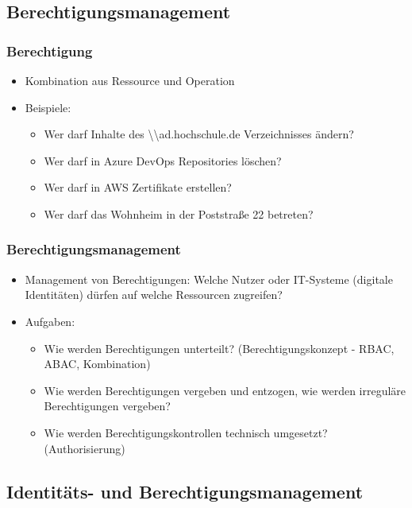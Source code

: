 \documentclass[11pt]{beamer}
\begin{document}
\subsection{Berechtigungsmanagement}
\begin{frame}
  \frametitle{Berechtigung}
  \begin{itemize}
    \item Kombination aus Ressource und Operation~
    \item Beispiele:
          \begin{itemize}
            \item Wer darf Inhalte des \textbackslash{}\textbackslash{}ad.hochschule.de Verzeichnisses ändern?
            \item Wer darf in Azure DevOps Repositories löschen?
            \item Wer darf in AWS Zertifikate erstellen?
            \item Wer darf das Wohnheim in der Poststraße 22 betreten?
          \end{itemize}
  \end{itemize}
\end{frame}

\begin{frame}
  \frametitle{Berechtigungsmanagement}
  \begin{itemize}
    \item Management von Berechtigungen: Welche Nutzer oder IT-Systeme (digitale Identitäten) dürfen auf welche Ressourcen zugreifen?
    \item Aufgaben:
          \begin{itemize}
            \item Wie werden Berechtigungen unterteilt? (Berechtigungskonzept - RBAC, ABAC, Kombination)
            \item Wie werden Berechtigungen vergeben und entzogen, wie werden irreguläre Berechtigungen vergeben?
            \item Wie werden Berechtigungskontrollen technisch umgesetzt? (Authorisierung)
          \end{itemize}
  \end{itemize}
\end{frame}

\subsection{Identitäts- und Berechtigungsmanagement}
\end{document}
